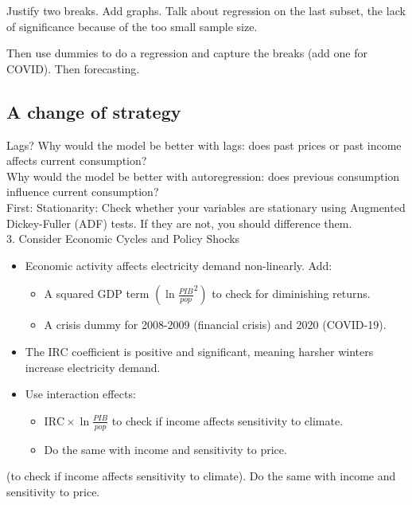 Justify two breaks. 
Add graphs. 
Talk about regression on the last subset, the lack of significance because of the too small sample size. 

Then use dummies to do a regression and capture the breaks (add one for COVID). Then forecasting.

\subsection{A change of strategy}
Lags? Why would the model be better with lags: does past prices or past income affects current consumption? \\

Why would the model be better with autoregression: does previous consumption influence current consumption? \\

First: Stationarity: Check whether your variables are stationary using Augmented Dickey-Fuller (ADF) tests. If they are not, you should difference them. \\

3. Consider Economic Cycles and Policy Shocks
    \begin{itemize}
        \item Economic activity affects electricity demand non-linearly. Add:
        \begin{itemize}
            \item A squared GDP term $(\ln{\frac{{PIB}}{pop}}^2)$ to check for diminishing returns.
            \item A crisis dummy for 2008-2009 (financial crisis) and 2020 (COVID-19).
        \end{itemize}
        \item The IRC coefficient is positive and significant, meaning harsher winters increase electricity demand.
        \item Use interaction effects:
        \begin{itemize}
            \item $\text{IRC} \times \ln{\frac{PIB}{pop}}$ to check if income affects sensitivity to climate.
            \item Do the same with income and sensitivity to price.
        \end{itemize}
    \end{itemize}


(to check if income affects sensitivity to climate). Do the same with income and sensitivity to price. \\


